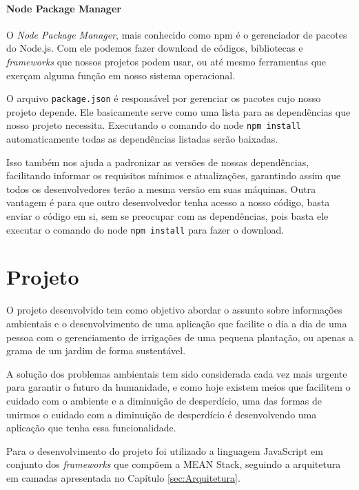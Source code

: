 \documentclass[
	12pt,				%
	openright,			%
	twoside,			%
	a4paper,			%
	english,			%
	brazil				%
	]{abntex2}
\begin{document}
\subsubsection{Node Package Manager}

O \textit{Node Package Manager}, mais conhecido como npm é o gerenciador de pacotes do Node.js. Com ele podemos fazer download de códigos, bibliotecas e \textit{frameworks} que nossos projetos podem usar, ou até mesmo ferramentas que exerçam alguma função em nosso sistema operacional.

O arquivo \verb|package.json| é responsável por gerenciar os pacotes cujo nosso projeto depende. Ele basicamente serve como uma lista para as dependências que nosso projeto necessita. Executando o comando do node \verb|npm install| automaticamente todas as dependências listadas serão baixadas.

Isso também nos ajuda a padronizar as versões de nossas dependências, facilitando informar os requisitos mínimos e atualizações, garantindo assim que todos os desenvolvedores terão a mesma versão em suas máquinas. Outra vantagem é para que outro desenvolvedor tenha acesso a nosso código, basta enviar o código em si, sem se preocupar com as dependências, pois basta ele executar o comando do node \verb|npm install| para fazer o download.

\chapter{Projeto}

O projeto desenvolvido tem como objetivo abordar o assunto sobre informações ambientais e o desenvolvimento de uma aplicação que facilite o dia a dia de uma pessoa com o gerenciamento de irrigações de uma pequena plantação, ou apenas a grama de um jardim de forma sustentável.

A solução dos problemas ambientais tem sido considerada cada vez mais urgente para garantir o futuro da humanidade, e como hoje existem meios que facilitem o cuidado com o ambiente e a diminuição de desperdício, uma das formas de unirmos o cuidado com a diminuição de desperdício é desenvolvendo uma aplicação que tenha essa funcionalidade.

Para o desenvolvimento do projeto foi utilizado a linguagem JavaScript em conjunto dos \textit{frameworks} que compõem a MEAN Stack, seguindo a arquitetura em camadas apresentada no Capítulo \ref{sec:Arquitetura}.
\end{document}
